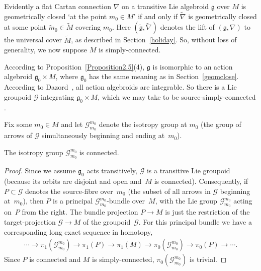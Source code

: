 Evidently a f\/lat Cartan connection $\nabla$ on a transitive Lie
algebroid $\mathfrak g$ over $M$ is geometrically closed `at the point
$m_0 \in M$' if and only if $\tilde \nabla$ is geometrically closed at
some point $\tilde m_0 \in \tilde M$ covering $m_0$. Here $(\tilde
{\mathfrak g},\tilde \nabla )$ denotes the lift of $({\mathfrak
  g},\nabla )$ to the universal cover $\tilde M$, as described in
Section~\ref{holiday}. So, without loss of generality, we now suppose $M$ is
simply-connected.

According to Proposition~\ref{Proposition2.5}(4),
  $\mathfrak g$ is
isomorphic to an action algebroid ${\mathfrak g}_0 \times M$, where
${\mathfrak g}_0$ has the same meaning as in
Section~\ref{geomclose}. According to Dazord~\cite{Dazord_97}, all action
algebroids are integrable. So there is a Lie groupoid ${\mathcal G} $
integrating $ {\mathfrak g}_0 \times M$, which we may take to be
source-simply-connected \cite[Lie~I]{Crainic_Fernandes_11}.

Fix some $m_0 \in M$ and let ${\mathcal G}_{m_0}^{m_0}$ denote the
isotropy group at $m_0$ (the group of arrows of ${\mathcal G}$
simultaneously beginning and ending at~$m_0$).

\begin{LemmaBlaom}\label{Lemma4.1}
The isotropy group ${\mathcal G}_{m_0}^{m_0}$ is connected.
\end{LemmaBlaom}

\begin{proof}
  Since we assume ${\mathfrak g}_0$ acts transitively, ${\mathcal G} $
  is a transitive Lie groupoid (because its orbits are disjoint and
  open and~$M$ is connected). Consequently, if $P \subset {\mathcal
    G}$ denotes the source-f\/ibre over~$m_0$ (the subset of all arrows
  in ${\mathcal G} $ beginning at~$m_0$), then $P$ is a principal
  ${\mathcal G}_{m_0}^{m_0}$-bundle over~$M$, with the Lie group
  ${\mathcal G}_{m_0}^{m_0}$ acting on~$P$ from the right. The bundle
  projection $P \rightarrow M$ is just the restriction of the
  target-projection ${\mathcal G} \rightarrow M$ of the groupoid~$\mathcal G$. For this principal bundle we have a corresponding long
  exact sequence in homotopy,
  \begin{gather*}
    \cdots \rightarrow  \pi_1({\mathcal G}_{m_0}^{m_0})\rightarrow \pi_1(P)
    \rightarrow \pi_1(M) \rightarrow \pi_0 ({\mathcal
      G}_{m_0}^{m_0})\rightarrow \pi_0(P) \rightarrow \cdots  .
  \end{gather*}
  Since $P$ is connected and $M$ is simply-connected, $\pi_0({\mathcal
    G}_{m_0}^{m_0})$ is trivial.
\end{proof}

